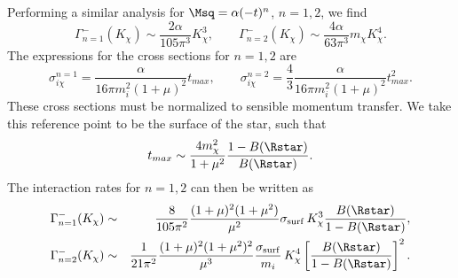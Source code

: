 Performing a similar analysis for $\Msq=\alpha (-t)^n$, $n=1,2$, 
we find 
\begin{equation}
\Gamma_{n=1}^{-}(K_\chi) 
\sim \frac{2\alpha }{105\pi^3}K_\chi^3,\qquad 
\Gamma_{n=2}^{-}(K_\chi) 
\sim \frac{4\alpha }{63\pi^3}m_\chi K_\chi^4. 
\end{equation}
The expressions for the cross sections for $n=1,2$ are 
\begin{equation}
\sigma^{n=1}_{i\chi} = \frac{\alpha}{16\pi m_i^2(1+\mu)^2}t_{max},\qquad
\sigma^{n=2}_{i\chi} = \frac{4}{3}\frac{\alpha}{16\pi m_i^2(1+\mu)^2}t_{max}^2.   
\end{equation}
These cross sections must be normalized to sensible momentum transfer. We take this reference point to be the surface of the star, such that 
\begin{equation}
      t_{max} \sim \frac{4m_\chi^2}{1+\mu^2}\frac{1-B(\Rstar)}{B(\Rstar)}.   
\end{equation}
The interaction rates for $n=1,2$ can then be written as
\begin{eqnarray}
    \Gamma_{n=1}^{-}(K_\chi) &\sim& \frac{8}{105 \pi^2} \frac{(1+\mu)^2(1+\mu^2)}{\mu^2} \sigma_{\rm surf} \, K_\chi^3 \frac{B(\Rstar)}{1-B(\Rstar)}, \label{eq:intraten1}\\
\Gamma_{n=2}^{-}(K_\chi) &\sim& \frac{1}{21 \pi^2} \frac{(1+\mu)^2(1+\mu^2)^2}{\mu^3} \frac{\sigma_{\rm surf}}{m_i} \, K_\chi^4\left[\frac{B(\Rstar)}{1-B(\Rstar)}\right]^2.
\label{eq:intraten2}
\end{eqnarray}


